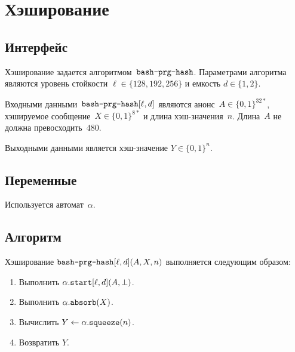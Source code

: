 \section{Хэширование}\label{PRG.Hash}

\subsection{Интерфейс}\label{PRG.Hash.IFace}

Хэширование задается алгоритмом~$\texttt{bash-prg-hash}$.
Параметрами алгоритма являются уровень стойкости $\ell\in\{128,192,256\}$
и емкость $d\in\{1,2\}$. 

Входными данными~$\texttt{bash-prg-hash}[\ell, d]$ являются 
анонс~$A\in\{0,1\}^{32*}$, хэшируемое сообщение~$X\in\{0,1\}^{8*}$ 
и длина хэш-значения~$n$. Длина~$A$ не должна превосходить~$480$.

Выходными данными является хэш-значение $Y\in\{0,1\}^n$.

\subsection{Переменные}\label{PRG.Hash.Vars}

Используется автомат~$\alpha$.

\subsection{Алгоритм}\label{PRG.Hash.Alg}

Хэширование $\texttt{bash-prg-hash}[\ell,d](A,X,n)$ выполняется следующим 
образом:
\begin{enumerate}
\item
Выполнить $\alpha.\texttt{start}[\ell,d](A,\perp)$.
\item
Выполнить $\alpha.\texttt{absorb}(X)$.
\item
Вычислить $Y\leftarrow \alpha.\texttt{squeeze}(n)$.
\item
Возвратить $Y$.
\end{enumerate}
